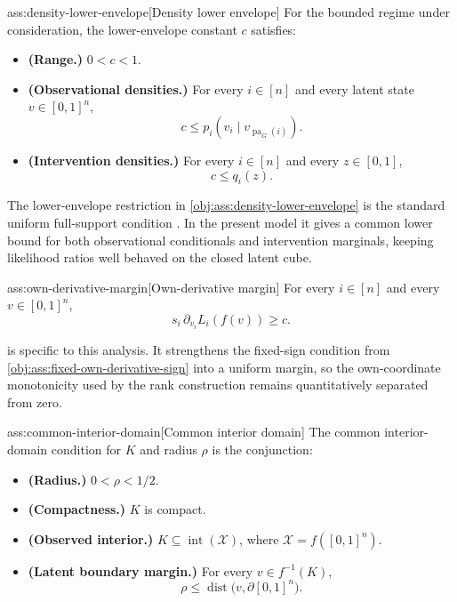 \documentclass[11pt]{article}
\begin{document}
\begin{assumptionv}{ass:density-lower-envelope}[Density lower envelope]
For the bounded regime under consideration, the lower-envelope constant \(c\) satisfies:
\begin{itemize}
\item \textbf{(Range.)} \(0<c<1\).
\item \textbf{(Observational densities.)} For every \(i\in[n]\) and every latent state \(v\in[0,1]^n\),
\[
c\le p_i(v_i\mid v_{\operatorname{pa}_G(i)}).
\]
\item \textbf{(Intervention densities.)} For every \(i\in[n]\) and every \(z\in[0,1]\),
\[
c\le q_i(z).
\]
\end{itemize}
\end{assumptionv}

The lower-envelope restriction in \cref{obj:ass:density-lower-envelope} is the standard uniform full-support condition \citep{Xie2023UniformConditionalCDF}. In the present model it gives a common lower bound for both observational conditionals and intervention marginals, keeping likelihood ratios well behaved on the closed latent cube.

\begin{assumptionv}{ass:own-derivative-margin}[Own-derivative margin]
For every \(i\in[n]\) and every \(v\in[0,1]^n\),
\[
s_i\,\partial_{v_i}L_i(f(v))\ge c.
\]
\end{assumptionv}

 is specific to this analysis. It strengthens the fixed-sign condition from \cref{obj:ass:fixed-own-derivative-sign} into a uniform margin, so the own-coordinate monotonicity used by the rank construction remains quantitatively separated from zero.

\begin{assumptionv}{ass:common-interior-domain}[Common interior domain]
The common interior-domain condition for \(K\) and radius \(\rho\) is the conjunction:
\begin{itemize}
\item \textbf{(Radius.)} \(0<\rho<1/2\).
\item \textbf{(Compactness.)} \(K\) is compact.
\item \textbf{(Observed interior.)} \(K\subseteq \operatorname{int}(\mathcal X)\), where \(\mathcal X=f([0,1]^n)\).
\item \textbf{(Latent boundary margin.)} For every \(v\in f^{-1}(K)\),
\[
\rho\le \operatorname{dist}\bigl(v,\partial[0,1]^n\bigr).
\]
\end{itemize}
\end{assumptionv}
\end{document}
